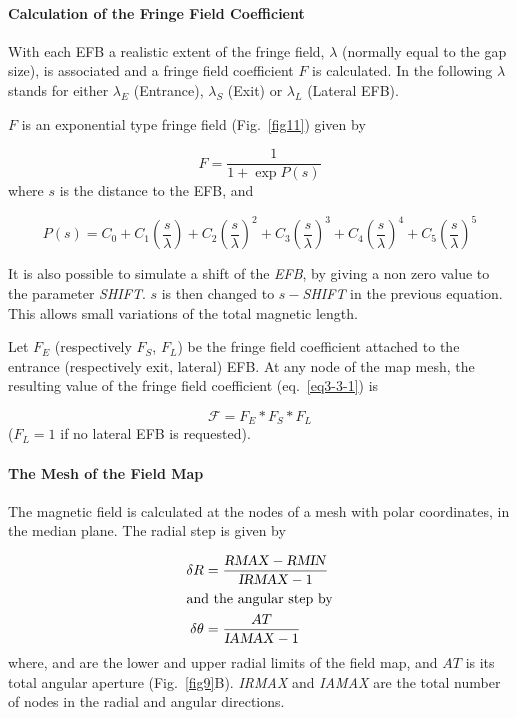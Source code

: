 \paragraph{Calculation of the Fringe Field Coefficient} 

\noindent With  each EFB a realistic extent of the fringe field, $\lambda $ 
(normally equal to the gap size), is associated and a fringe field coefficient
$ F $ is calculated. In the following $\lambda$ stands for either $ \lambda_ E $
(Entrance), $ \lambda_ S $ (Exit) or $ \lambda_ L $ (Lateral EFB).  
\bigskip

\noindent$ F $ is an exponential type fringe field (Fig.~\ref{fig11}) 
given by~\cite{Biblio12}     %

$$ F = \frac{1 }{ 1+ \exp P(s)} $$
%
 where $ s $ is the distance to the EFB, and 

$$
    P(s) = C_0
       +C_1 \left(  \dfrac{s }{ \lambda} \right) 
       +C_2 \left( \dfrac{s }{ \lambda} \right)^2 
       + C_3 \left( \dfrac{s }{ \lambda} \right)^3 
       +C_4 \left( \dfrac{s }{ \lambda} \right)^4 
       + C_5 \left(\dfrac{s }{ \lambda} \right)^5 $$
       
\noindent It is also possible to simulate a shift of the \textsl{EFB}, by giving a non
zero value to the parameter \textsl{SHIFT}.  $ s $ is then changed to $ s -$\textsl{SHIFT} in the 
previous equation.   This allows small variations of the total magnetic length.  
\bigskip

\noindent Let $ F_E $ (respectively $ F_S$, $F_L$)  be the fringe field
coefficient attached to the entrance (respectively exit, lateral) EFB. At any node of the map 
mesh, the resulting value of the fringe field coefficient (eq.~\ref{eq3-3-1}) is

$$  \mathcal{F} = F_E  \ast  F_S \ast   F_L $$
%
($F_L=1 $ if no lateral EFB is requested). 

\paragraph{The Mesh of the Field Map} 

\noindent The magnetic field is calculated at the nodes of a mesh with polar
coordinates, in the median plane.  The radial step is given by 

 \begin{align*}
	 \delta R & = \dfrac{\text{\textsl{RMAX}} - \text{\textsl{RMIN}} }{\text{\textsl{IRMAX}}-1} \\
	\intertext{and the angular step by} 
	 \delta \theta  & = \dfrac{AT }{\text{\textsl{IAMAX}}-1} 
 \end{align*}
\noindent where, \RMIN  and \RMAX   are the lower and upper
radial limits of the field map, and $ AT $ is its total angular aperture (Fig.~\ref{fig9}B).  
 \textsl{IRMAX}  and \textsl{IAMAX} are 
the total number of nodes in the radial and angular directions. 

